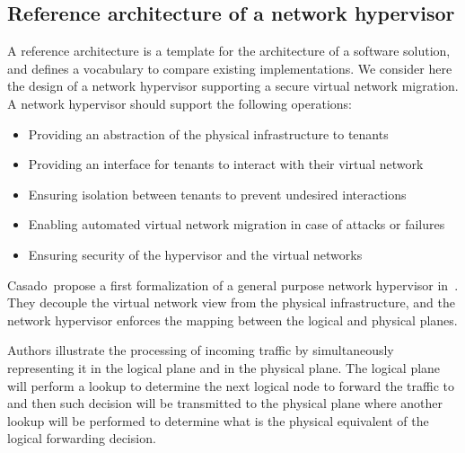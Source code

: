 \subsection{Reference architecture of a network hypervisor}
\label{sec:reference_archi}
A reference architecture is a template for the architecture of a software solution, and defines a vocabulary to compare existing implementations. 
We consider here the design of a network hypervisor supporting a secure virtual network migration.
A network hypervisor should support the following operations:
\begin{itemize}
    \item Providing an abstraction of the physical infrastructure to tenants
    \item Providing an interface for tenants to interact with their virtual network
    \item Ensuring isolation between tenants to prevent undesired interactions 
    \item Enabling automated virtual network migration in case of attacks or failures
    \item Ensuring security of the hypervisor and the virtual networks
\end{itemize}

Casado~\etal propose a first formalization of a general purpose network hypervisor in~\cite{Netvirt_Definition-Casado2010}. They decouple the virtual network view from the physical infrastructure, and the network hypervisor enforces the mapping between the logical and physical planes.

Authors illustrate the processing of incoming traffic by simultaneously representing it in the logical plane and in the physical plane.
The logical plane will perform a lookup to determine the next logical node to forward the traffic to and then such decision will be transmitted to the physical plane where another lookup will be performed to determine what is the physical equivalent of the logical forwarding decision.

